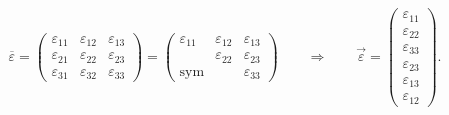 \[
\overline{\varepsilon}
=
\begin{pmatrix}
	\varepsilon_{11} & \varepsilon_{12} & \varepsilon_{13} \\ 
	\varepsilon_{21} & \varepsilon_{22} & \varepsilon_{23} \\
	\varepsilon_{31} & \varepsilon_{32} & \varepsilon_{33}
\end{pmatrix}
=
\begin{pmatrix}
	\varepsilon_{11} & \varepsilon_{12} & \varepsilon_{13} \\ 
	                 & \varepsilon_{22} & \varepsilon_{23} \\
	\text{sym}       &                  & \varepsilon_{33}
\end{pmatrix}
\qquad
\Rightarrow
\qquad
\vec{\varepsilon}
=
\begin{pmatrix}
	\varepsilon_{11} \\
	\varepsilon_{22} \\
	\varepsilon_{33} \\
	\varepsilon_{23} \\
	\varepsilon_{13} \\
	\varepsilon_{12}
\end{pmatrix}
.
\]


